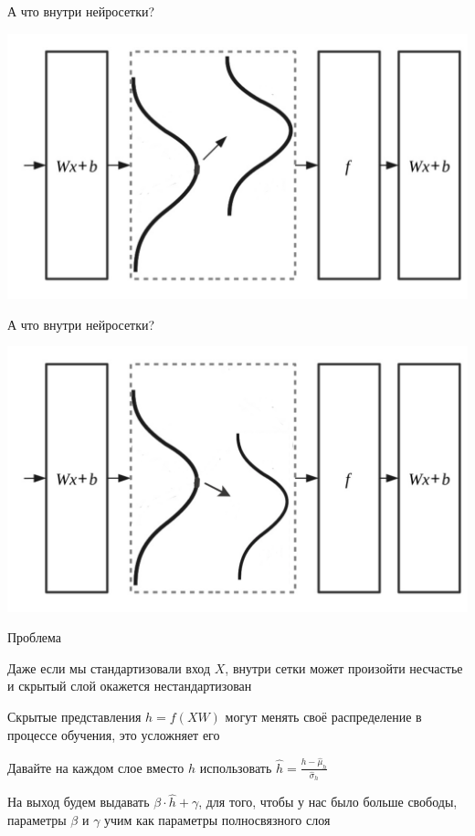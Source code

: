 \documentclass[notes,12pt, aspectratio=169]{beamer}
\newenvironment{wideitemize}{\itemize\addtolength{\itemsep}{10pt}}{\enditemize}
\begin{document}
\begin{frame}{А что внутри нейросетки?}
	\begin{center}
		\includegraphics[width=.7\linewidth]{distributions_1.png}
	\end{center}
\end{frame}


\begin{frame}{А что внутри нейросетки?}
	\begin{center}
		\includegraphics[width=.7\linewidth]{distributions_2.png}
	\end{center}
\end{frame}

\begin{frame}{Проблема}
	\begin{wideitemize}
		\item  Даже если мы стандартизовали вход $X$, внутри сетки может произойти несчастье и скрытый слой окажется нестандартизован 
		
		\item  Скрытые представления $h = f(XW)$  могут менять своё распределение в процессе обучения, это усложняет его  
		
		\item Давайте на каждом слое вместо $h$ использовать  $\hat{h} = \frac{h - \hat{\mu}_h}{\hat{\sigma}_h}$
		
		\item На выход будем выдавать $\beta \cdot  \hat h + \gamma$, для того, чтобы у нас было больше свободы, параметры $\beta$ и $\gamma$ учим как параметры полносвязного слоя
	\end{wideitemize}
\end{frame}
\end{document}
